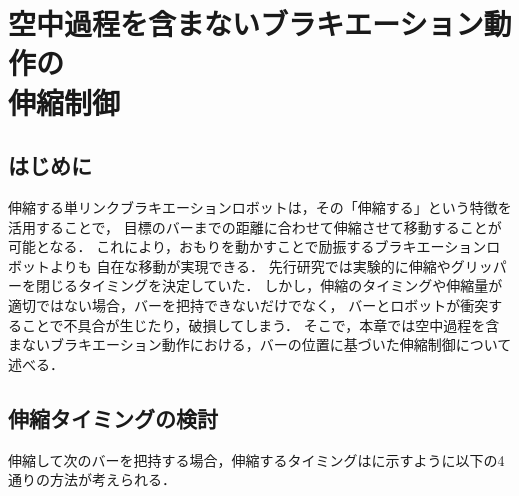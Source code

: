\chapter[空中過程を含まないブラキエーション動作の伸縮制御]%
{空中過程を含まないブラキエーション動作の\\伸縮制御}
        \section{はじめに}
        
        伸縮する単リンクブラキエーションロボットは，その「伸縮する」という特徴を活用することで，
        目標のバーまでの距離に合わせて伸縮させて移動することが可能となる．
        これにより，おもりを動かすことで励振するブラキエーションロボット\cite{akahane2022single}よりも
        自在な移動が実現できる．
        先行研究\cite{Hijiri:Robomech2024}では実験的に伸縮やグリッパーを閉じるタイミングを決定していた．
        しかし，伸縮のタイミングや伸縮量が適切ではない場合，バーを把持できないだけでなく，
        バーとロボットが衝突することで不具合が生じたり，破損してしまう．
        そこで，本章では空中過程を含まないブラキエーション動作における，バーの位置に基づいた伸縮制御について述べる．
          
        \section{伸縮タイミングの検討}

        伸縮して次のバーを把持する場合，伸縮するタイミングはに示すように以下の4通りの方法が考えられる．

